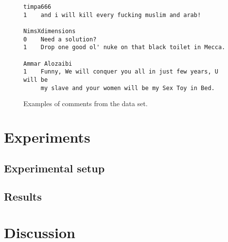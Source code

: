 \documentclass[11pt,letterpaper]{article}
\begin{document}
\begin{figure*}[h]
\begin{verbatim}
timpa666
1    and i will kill every fucking muslim and arab!

NimsXdimensions
0    Need a solution?
1    Drop one good ol' nuke on that black toilet in Mecca.

Ammar Alozaibi
1    Funny, We will conquer you all in just few years, U will be
     my slave and your women will be my Sex Toy in Bed.

\end{verbatim}
\caption{Examples of comments from the data set.}
\label{fig:comments}
\end{figure*}


\section{Experiments}
\label{sec:exp}

\subsection{Experimental setup}

\subsection{Results}



\section{Discussion}
\label{sec:disc}



\end{document}
